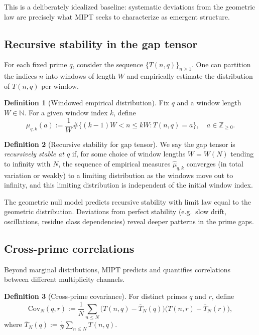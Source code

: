 \documentclass[11pt]{article}
\theoremstyle{definition}
\newtheorem{definition}{Definition}[section]
\theoremstyle{plain}
\theoremstyle{remark}
\newcommand{\ZZ}{\mathbb{Z}}
\newcommand{\Cov}{\mathrm{Cov}}
\newcommand{\1}{\mathbb{1}}
\begin{document}
This is a deliberately idealized baseline: systematic deviations from the geometric law are precisely what MIPT seeks to characterize as emergent structure.

\subsection{Recursive stability in the gap tensor}

For each fixed prime \(q\), consider the sequence \(\{T(n,q)\}_{n\ge 1}\). One can partition the indices \(n\) into windows of length \(W\) and empirically estimate the distribution of \(T(n,q)\) per window.

\begin{definition}[Windowed empirical distribution]
Fix \(q\) and a window length \(W\in\mathbb{N}\). For a given window index \(k\), define
\[
  \hat{\mu}_{q,k}(a) := \frac{1}{W}\#\{(k-1)W < n \le kW : T(n,q) = a\},\quad a\in\ZZ_{\ge 0}.
\]
\end{definition}

\begin{definition}[Recursive stability for gap tensor]
We say the gap tensor is \emph{recursively stable at \(q\)} if, for some choice of window lengths \(W=W(N)\) tending to infinity with \(N\), the sequence of empirical measures \(\hat{\mu}_{q,k}\) converges (in total variation or weakly) to a limiting distribution as the windows move out to infinity, and this limiting distribution is independent of the initial window index.
\end{definition}

The geometric null model predicts recursive stability with limit law equal to the geometric distribution. Deviations from perfect stability (e.g.\ slow drift, oscillations, residue class dependencies) reveal deeper patterns in the prime gaps.

\subsection{Cross-prime correlations}

Beyond marginal distributions, MIPT predicts and quantifies correlations between different multiplicity channels.

\begin{definition}[Cross-prime covariance]
For distinct primes \(q\) and \(r\), define
\[
  \Cov_N(q,r) := \frac{1}{N}\sum_{n\le N}\Big(T(n,q)-\overline{T}_N(q)\Big)\Big(T(n,r)-\overline{T}_N(r)\Big),
\]
where \(\overline{T}_N(q) := \frac{1}{N}\sum_{n\le N}T(n,q)\).
\end{definition}
\end{document}
